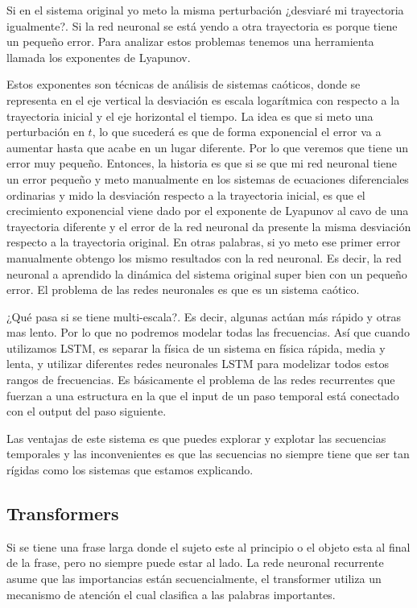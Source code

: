 Si en el sistema original yo meto la misma perturbación ¿desviaré mi trayectoria igualmente?. Si la red neuronal se está yendo a otra trayectoria es porque tiene un pequeño error. Para analizar estos problemas tenemos una herramienta llamada los exponentes de Lyapunov.

Estos exponentes son técnicas de análisis de sistemas caóticos, donde se representa en el eje vertical la desviación es escala logarítmica con respecto a la trayectoria inicial y el eje horizontal el tiempo. La idea es que si meto una perturbación en $t$, lo que sucederá es que de forma exponencial el error va a aumentar hasta que acabe en un lugar diferente. Por lo que veremos que tiene un error muy pequeño. Entonces, la historia es que si se que mi red neuronal tiene un error pequeño y meto manualmente en los sistemas de ecuaciones diferenciales ordinarias y mido la desviación respecto a la trayectoria inicial, es que el crecimiento exponencial viene dado por el exponente de Lyapunov al cavo de una trayectoria diferente y el error de la red neuronal da presente la misma desviación respecto a la trayectoria original. En otras palabras, si yo meto ese primer error manualmente obtengo los mismo resultados con la red neuronal. Es decir, la red neuronal a aprendido la dinámica del sistema original super bien con un pequeño error. El problema de las redes neuronales es que es un sistema caótico.

¿Qué pasa si se tiene multi-escala?. Es decir, algunas actúan más rápido y otras mas lento. Por lo que no podremos modelar todas las frecuencias. Así que cuando utilizamos LSTM, es separar la física de un sistema en física rápida, media y lenta, y utilizar diferentes redes neuronales LSTM para modelizar todos estos rangos de frecuencias. Es básicamente el problema de las redes recurrentes que fuerzan a una estructura en la que el input de un paso temporal está conectado con el output del paso siguiente.

Las ventajas de este sistema es que puedes explorar y explotar las secuencias temporales y las inconvenientes es que las secuencias no siempre tiene que ser tan rígidas como los sistemas que estamos explicando.

\subsection{Transformers}
Si se tiene una frase larga donde el sujeto este al principio o el objeto esta al final de la frase, pero no siempre puede estar al lado. La rede neuronal recurrente asume que las importancias están secuencialmente, el transformer utiliza un mecanismo de atención el cual clasifica a las palabras importantes.

